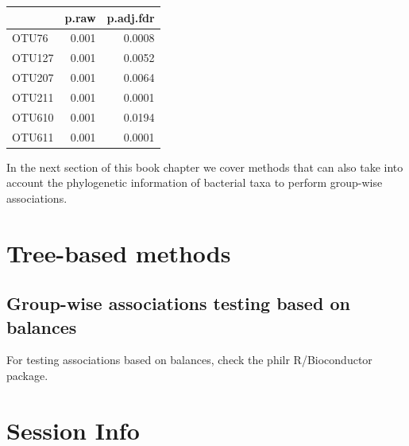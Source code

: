 \documentclass[
]{book}
\newenvironment{Shaded}{\begin{snugshade}}{\end{snugshade}}
\newcommand{\AttributeTok}[1]{\textcolor[rgb]{0.77,0.63,0.00}{#1}}
\newcommand{\FloatTok}[1]{\textcolor[rgb]{0.00,0.00,0.81}{#1}}
\newcommand{\FunctionTok}[1]{\textcolor[rgb]{0.00,0.00,0.00}{#1}}
\newcommand{\NormalTok}[1]{#1}
\newcommand{\OtherTok}[1]{\textcolor[rgb]{0.56,0.35,0.01}{#1}}
\newcommand{\SpecialCharTok}[1]{\textcolor[rgb]{0.00,0.00,0.00}{#1}}
\begin{document}
\begin{Shaded}
\end{Shaded}

\begin{tabular}{l|r|r}
\hline
  & p.raw & p.adj.fdr\\
\hline
OTU76 & 0.001 & 0.0008\\
\hline
OTU127 & 0.001 & 0.0052\\
\hline
OTU207 & 0.001 & 0.0064\\
\hline
OTU211 & 0.001 & 0.0001\\
\hline
OTU610 & 0.001 & 0.0194\\
\hline
OTU611 & 0.001 & 0.0001\\
\hline
\end{tabular}

In the next section of this book chapter we cover methods that can also take
into account the phylogenetic information of bacterial taxa to perform
group-wise associations.

\hypertarget{tree-based-methods}{%
\section{Tree-based methods}\label{tree-based-methods}}

\hypertarget{group-wise-associations-testing-based-on-balances}{%
\subsection{Group-wise associations testing based on balances}\label{group-wise-associations-testing-based-on-balances}}

For testing associations based on balances, check the philr R/Bioconductor package.

\hypertarget{session-info-7}{%
\section*{Session Info}\label{session-info-7}}
\end{document}
